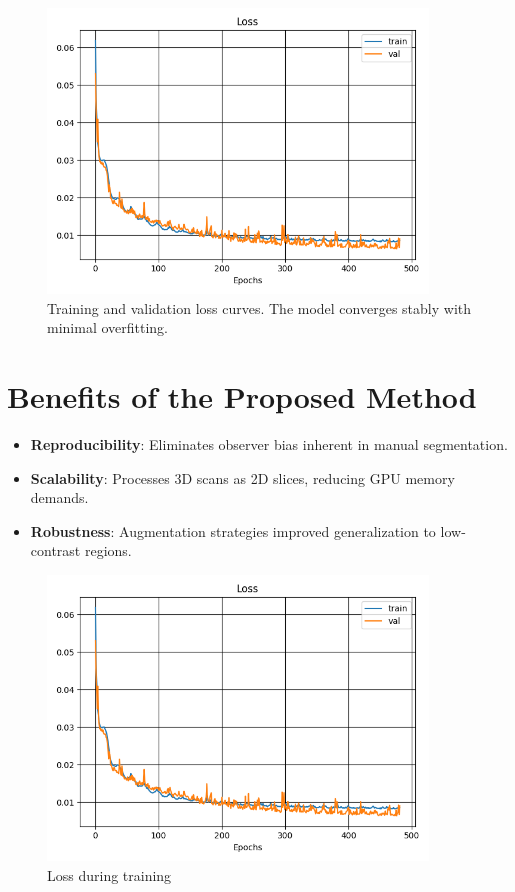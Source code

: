 \begin{figure}[ht]  
    \centering  
    \includegraphics[width=0.9\textwidth]{images/plots/Loss.png}
    \caption{Training and validation loss curves. The model converges stably with minimal overfitting.}  
    \label{fig:loss}  
\end{figure}  


\section{Benefits of the Proposed Method}  
\begin{itemize}  
    \item \textbf{Reproducibility}: Eliminates observer bias inherent in manual segmentation.  
    \item \textbf{Scalability}: Processes 3D scans as 2D slices, reducing GPU memory demands.  
    \item \textbf{Robustness}: Augmentation strategies improved generalization to low-contrast regions.  
\end{itemize}  


\begin{figure}[!htb]
    \centering
    \includegraphics[width=0.9\textwidth]{images/plots/Loss.png}
    \caption{Loss during training}
    \label{fig::loss}
\end{figure}

